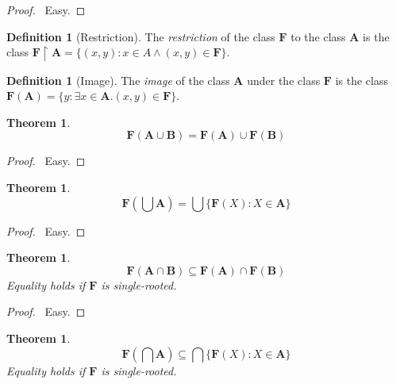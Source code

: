 \documentclass{article}
\let\qed\relax
\newtheorem{theorem}[axiom]{Theorem}
\theoremstyle{definition}
\newtheorem{definition}[axiom]{Definition}
\begin{document}
    \begin{proof}
        \pf\ Easy. \qed
    \end{proof}

    \begin{definition}[Restriction]
        The \emph{restriction} of the class $\mathbf{F}$ to the class $\mathbf{A}$ is the class
        $\mathbf{F} \restriction \mathbf{A} = \{ (x,y) : x \in A \wedge (x,y) \in \mathbf{F} \}$.
    \end{definition}

    \begin{definition}[Image]
        The \emph{image} of the class $\mathbf{A}$ under the class $\mathbf{F}$ is the class
        $\mathbf{F}(\mathbf{A}) = \{ y : \exists x \in \mathbf{A}. (x,y) \in \mathbf{F} \}$.
    \end{definition}
    
    \begin{theorem}
        \[ \mathbf{F}(\mathbf{A} \cup \mathbf{B}) = \mathbf{F}(\mathbf{A}) \cup \mathbf{F}(\mathbf{B}) \]
    \end{theorem}

    \begin{proof}
        \pf\ Easy. \qed
    \end{proof}

    \begin{theorem}
        \[ \mathbf{F}(\bigcup \mathbf{A}) = \bigcup \{ \mathbf{F}(X) : X \in \mathbf{A} \} \]
    \end{theorem}

    \begin{proof}
        \pf\ Easy. \qed
    \end{proof}
    
    \begin{theorem}
        \[ \mathbf{F}(\mathbf{A} \cap \mathbf{B}) \subseteq \mathbf{F}(\mathbf{A}) \cap \mathbf{F}(\mathbf{B}) \]
        Equality holds if $\mathbf{F}$ is single-rooted.
    \end{theorem}

    \begin{proof}
        \pf\ Easy. \qed
    \end{proof}

    \begin{theorem}
        \[ \mathbf{F}(\bigcap \mathbf{A}) \subseteq \bigcap \{ \mathbf{F}(X) : X \in \mathbf{A} \} \]
        Equality holds if $\mathbf{F}$ is single-rooted.
    \end{theorem}
\end{document}
